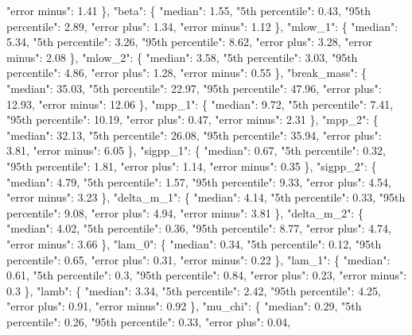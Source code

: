 {{        "error minus": 1.41%
      \}, %
      "beta": \{%
        "median": 1.55, %
        "5th percentile": 0.43, %
        "95th percentile": 2.89, %
        "error plus": 1.34, %
        "error minus": 1.12%
      \}, %
      "mlow\_1": \{%
        "median": 5.34, %
        "5th percentile": 3.26, %
        "95th percentile": 8.62, %
        "error plus": 3.28, %
        "error minus": 2.08%
      \}, %
      "mlow\_2": \{%
        "median": 3.58, %
        "5th percentile": 3.03, %
        "95th percentile": 4.86, %
        "error plus": 1.28, %
        "error minus": 0.55%
      \}, %
      "break\_mass": \{%
        "median": 35.03, %
        "5th percentile": 22.97, %
        "95th percentile": 47.96, %
        "error plus": 12.93, %
        "error minus": 12.06%
      \}, %
      "mpp\_1": \{%
        "median": 9.72, %
        "5th percentile": 7.41, %
        "95th percentile": 10.19, %
        "error plus": 0.47, %
        "error minus": 2.31%
      \}, %
      "mpp\_2": \{%
        "median": 32.13, %
        "5th percentile": 26.08, %
        "95th percentile": 35.94, %
        "error plus": 3.81, %
        "error minus": 6.05%
      \}, %
      "sigpp\_1": \{%
        "median": 0.67, %
        "5th percentile": 0.32, %
        "95th percentile": 1.81, %
        "error plus": 1.14, %
        "error minus": 0.35%
      \}, %
      "sigpp\_2": \{%
        "median": 4.79, %
        "5th percentile": 1.57, %
        "95th percentile": 9.33, %
        "error plus": 4.54, %
        "error minus": 3.23%
      \}, %
      "delta\_m\_1": \{%
        "median": 4.14, %
        "5th percentile": 0.33, %
        "95th percentile": 9.08, %
        "error plus": 4.94, %
        "error minus": 3.81%
      \}, %
      "delta\_m\_2": \{%
        "median": 4.02, %
        "5th percentile": 0.36, %
        "95th percentile": 8.77, %
        "error plus": 4.74, %
        "error minus": 3.66%
      \}, %
      "lam\_0": \{%
        "median": 0.34, %
        "5th percentile": 0.12, %
        "95th percentile": 0.65, %
        "error plus": 0.31, %
        "error minus": 0.22%
      \}, %
      "lam\_1": \{%
        "median": 0.61, %
        "5th percentile": 0.3, %
        "95th percentile": 0.84, %
        "error plus": 0.23, %
        "error minus": 0.3%
      \}, %
      "lamb": \{%
        "median": 3.34, %
        "5th percentile": 2.42, %
        "95th percentile": 4.25, %
        "error plus": 0.91, %
        "error minus": 0.92%
      \}, %
      "mu\_chi": \{%
        "median": 0.29, %
        "5th percentile": 0.26, %
        "95th percentile": 0.33, %
        "error plus": 0.04, %
}}
